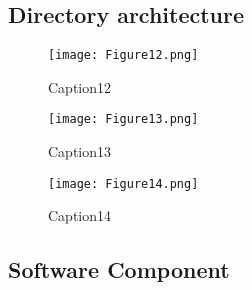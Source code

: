 \documentclass[10pt,a4paper,twocolumn]{report}
\begin{document}
	\subsection{Directory architecture}
		\begin{figure}[h]
				\texttt{[image: Figure12.png]}
				\caption{Caption12}
				\label{fig12}
		\end{figure} 
		\begin{figure}
				\texttt{[image: Figure13.png]}
				\caption{Caption13}
				\label{fig13}
		\end{figure} 
		\begin{figure}
				\texttt{[image: Figure14.png]}
				\caption{Caption14}
				\label{fig14}
		\end{figure} 
	
	
	
	\subsection{Software Component}
\end{document}
